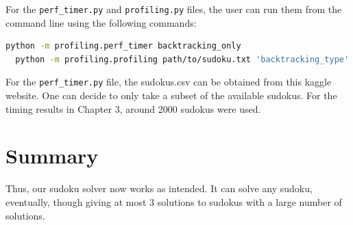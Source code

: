 \documentclass[12pt]{report} %
\begin{document}
For the \texttt{perf\_timer.py} and \texttt{profiling.py} files, the user can run them from the command line using the following commands:

\begin{lstlisting}[language=bash, caption={How to run the profiling and timing files}]
  python -m profiling.perf_timer backtracking_only
  python -m profiling.profiling path/to/sudoku.txt 'backtracking_type' backtracking_only
\end{lstlisting}

For the \texttt{perf\_timer.py} file, the sudokus.csv can be obtained from this kaggle website\cite{kaggle_sudoku_dataset}. One can decide to only take a subset of the available sudokus. For the timing results in Chapter 3, around 2000 sudokus were used.


\chapter{Summary}

Thus, our sudoku solver now works as intended. It can solve any sudoku, eventually, though giving at most 3 solutions to sudokus with a large number of solutions.



\end{document}
